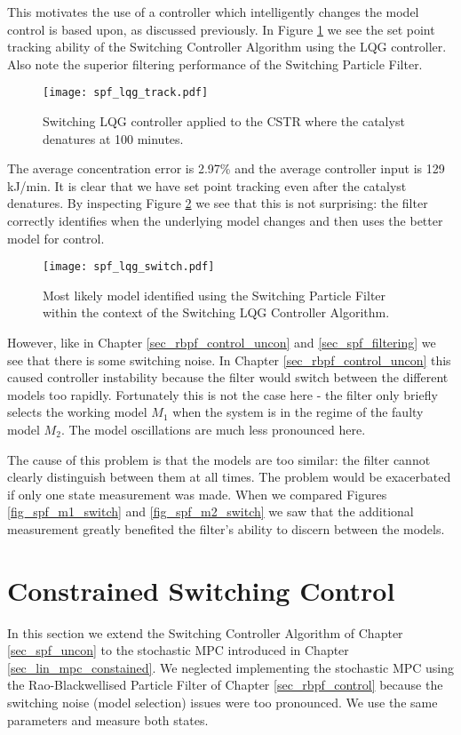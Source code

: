 This motivates the use of a controller which intelligently changes the model control is based upon, as discussed previously. In Figure \ref{fig_spf_lqg_track} we see the set point tracking ability of the Switching Controller Algorithm using the LQG controller. Also note the superior filtering performance of the Switching Particle Filter.
\begin{figure}[H] 
\centering
\texttt{[image: spf\_lqg\_track.pdf]}
\caption{Switching LQG controller applied to the CSTR where the catalyst denatures at 100 minutes.}
\label{fig_spf_lqg_track}
\end{figure}
The average concentration error is 2.97\% and the average controller input is 129 kJ/min. It is clear that we have set point tracking even after the catalyst denatures. By inspecting Figure \ref{fig_spf_lqg_switch} we see that this is not surprising: the filter correctly identifies when the underlying model changes and then uses the better model for control. 
\begin{figure}[H] 
\centering
\texttt{[image: spf\_lqg\_switch.pdf]}
\caption{Most likely model identified using the Switching Particle Filter within the context of the Switching LQG Controller Algorithm.}
\label{fig_spf_lqg_switch}
\end{figure}
However, like in Chapter \ref{sec_rbpf_control_uncon} and \ref{sec_spf_filtering} we see that there is some switching noise. In Chapter \ref{sec_rbpf_control_uncon} this caused controller instability because the filter would switch between the different models too rapidly. Fortunately this is not the case here - the filter only briefly selects the working model $M_1$ when the system is in the regime of the faulty model $M_2$. The model oscillations are much less pronounced here.

The cause of this problem is that the models are too similar: the filter cannot clearly distinguish between them at all times. The problem would be exacerbated if only one state measurement was made. When we compared Figures \ref{fig_spf_m1_switch} and \ref{fig_spf_m2_switch} we saw that the additional measurement greatly benefited the filter's ability to discern between the models.

\section{Constrained Switching Control} 
In this section we extend the Switching Controller Algorithm of Chapter \ref{sec_spf_uncon} to the stochastic MPC introduced in Chapter \ref{sec_lin_mpc_constained}. We neglected implementing the stochastic MPC using the Rao-Blackwellised Particle Filter of Chapter \ref{sec_rbpf_control} because the switching noise (model selection) issues were too pronounced. We use the same parameters and measure both states. 

